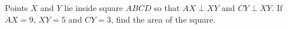 Points $X$ and $Y$ lie inside square $ABCD$ so that $AX\perp XY$ and $CY\perp XY$. If $AX=9$, $XY=5$ and $CY=3$, find the area of the square.
